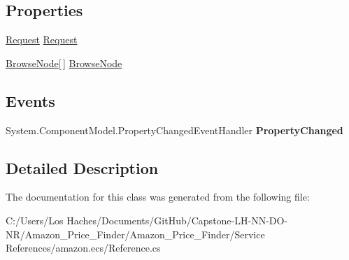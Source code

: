 \subsection*{Properties}
\begin{DoxyCompactItemize}
\item 
\hypertarget{class_amazon___price___finder_1_1amazon_1_1ecs_1_1_browse_nodes_a5eafcb646791470d0f4bdb7b36b9a1fd}{\hyperlink{class_amazon___price___finder_1_1amazon_1_1ecs_1_1_request}{Request} \hyperlink{class_amazon___price___finder_1_1amazon_1_1ecs_1_1_browse_nodes_a5eafcb646791470d0f4bdb7b36b9a1fd}{Request}}\label{class_amazon___price___finder_1_1amazon_1_1ecs_1_1_browse_nodes_a5eafcb646791470d0f4bdb7b36b9a1fd}

\begin{DoxyCompactList}\small\item\em \end{DoxyCompactList}\item 
\hypertarget{class_amazon___price___finder_1_1amazon_1_1ecs_1_1_browse_nodes_a8ec463d584f6acb45978ad177557481e}{\hyperlink{class_amazon___price___finder_1_1amazon_1_1ecs_1_1_browse_node}{Browse\-Node}\mbox{[}$\,$\mbox{]} \hyperlink{class_amazon___price___finder_1_1amazon_1_1ecs_1_1_browse_nodes_a8ec463d584f6acb45978ad177557481e}{Browse\-Node}}\label{class_amazon___price___finder_1_1amazon_1_1ecs_1_1_browse_nodes_a8ec463d584f6acb45978ad177557481e}

\begin{DoxyCompactList}\small\item\em \end{DoxyCompactList}\end{DoxyCompactItemize}
\subsection*{Events}
\begin{DoxyCompactItemize}
\item 
\hypertarget{class_amazon___price___finder_1_1amazon_1_1ecs_1_1_browse_nodes_a1a40433e5b6c94fa3353ad412d6c3c23}{System.\-Component\-Model.\-Property\-Changed\-Event\-Handler {\bfseries Property\-Changed}}\label{class_amazon___price___finder_1_1amazon_1_1ecs_1_1_browse_nodes_a1a40433e5b6c94fa3353ad412d6c3c23}

\end{DoxyCompactItemize}


\subsection{Detailed Description}


The documentation for this class was generated from the following file\-:\begin{DoxyCompactItemize}
\item 
C\-:/\-Users/\-Los Haches/\-Documents/\-Git\-Hub/\-Capstone-\/\-L\-H-\/\-N\-N-\/\-D\-O-\/\-N\-R/\-Amazon\-\_\-\-Price\-\_\-\-Finder/\-Amazon\-\_\-\-Price\-\_\-\-Finder/\-Service References/amazon.\-ecs/Reference.\-cs\end{DoxyCompactItemize}
